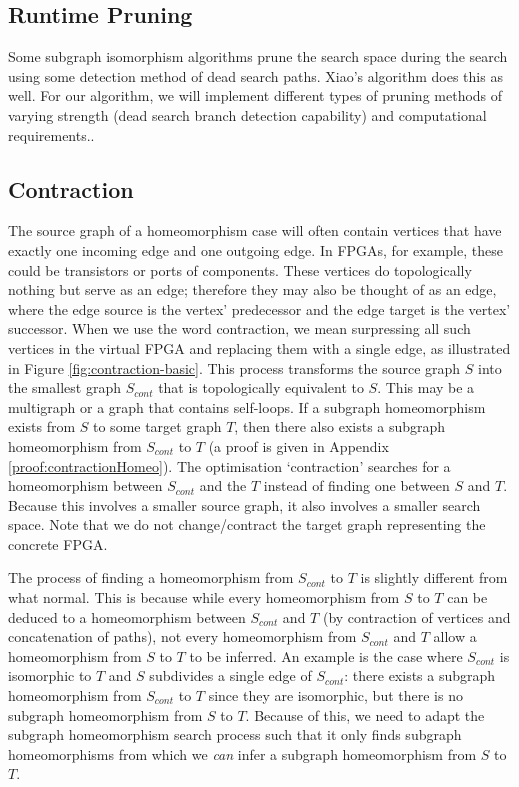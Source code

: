 \subsection{Runtime Pruning}
Some subgraph isomorphism algorithms \cite{Cordella2004, McCreesh2015} prune the search space during the search using some detection method of dead search paths. Xiao's algorithm does this as well. For our algorithm, we will implement different types of pruning methods of varying strength (dead search branch detection capability) and computational requirements..

\subsection{Contraction}
\label{sec:contraction}
The source graph of a homeomorphism case will often contain vertices that have exactly one incoming edge and one outgoing edge. In FPGAs, for example, these could be transistors or ports of components. These vertices do topologically nothing but serve as an edge; therefore they may also be thought of as an edge, where the edge source is the vertex' predecessor and the edge target is the vertex' successor. When we use the word contraction, we mean surpressing all such vertices in the virtual FPGA and replacing them with a single edge, as illustrated in Figure \ref{fig:contraction-basic}. This process transforms the source graph $S$ into the smallest graph $S_{cont}$ that is topologically equivalent to $S$. This may be a multigraph or a graph that contains self-loops. If a subgraph homeomorphism exists from $S$ to some target graph $T$, then there also exists a subgraph homeomorphism from $S_{cont}$ to $T$ (a proof is given in Appendix \ref{proof:contractionHomeo}). The optimisation `contraction' searches for a homeomorphism between $S_{cont}$ and the $T$ instead of finding one between $S$ and $T$. Because this involves a smaller source graph, it also involves a smaller search space. Note that we do not change/contract the target graph representing the concrete FPGA.

The process of finding a homeomorphism from $S_{cont}$ to $T$ is slightly different from what normal. This is because while every homeomorphism from $S$ to $T$ can be deduced to a homeomorphism between $S_{cont}$ and $T$ (by contraction of vertices and concatenation of paths), not every homeomorphism from $S_{cont}$ and $T$ allow a homeomorphism from $S$ to $T$ to be inferred. An example is the case where $S_{cont}$ is isomorphic to $T$ and $S$ subdivides a single edge of $S_{cont}$: there exists a subgraph homeomorphism from $S_{cont}$ to $T$ since they are isomorphic, but there is no subgraph homeomorphism from $S$ to $T$. Because of this, we need to adapt the subgraph homeomorphism search process such that it only finds subgraph homeomorphisms from which we \textit{can} infer a subgraph homeomorphism from $S$ to $T$.

